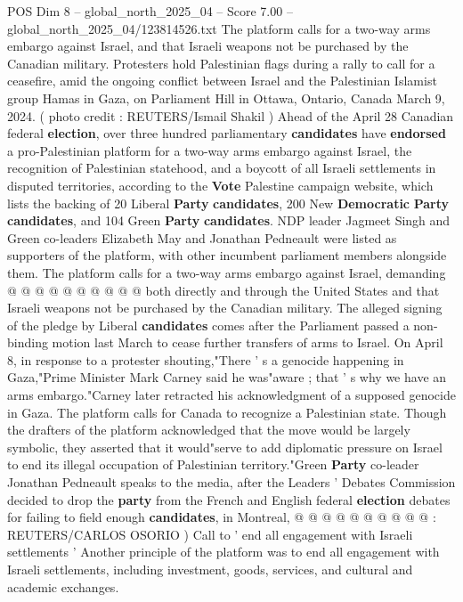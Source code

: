 \begin{textsample}{POS Dim 8 – global\_north\_2025\_04 – Score 7.00 – global\_north\_2025\_04/123814526.txt}  \label{ex:f8_pos_374}
The platform calls for a two-way arms embargo against Israel, and that Israeli weapons not be purchased by the Canadian military.
Protesters hold Palestinian flags during a rally to call for a ceasefire, amid the ongoing conflict between Israel and the Palestinian Islamist group Hamas in Gaza, on Parliament Hill in Ottawa, Ontario, Canada March 9, 2024. ( photo credit : REUTERS/Ismail Shakil ) Ahead of the April 28 Canadian federal \textbf{election}, over three hundred parliamentary \textbf{candidates} have \textbf{endorsed} a pro-Palestinian platform for a two-way arms embargo against Israel, the recognition of Palestinian statehood, and a boycott of all Israeli settlements in disputed territories, according to the \textbf{Vote} Palestine campaign website, which lists the backing of 20 Liberal \textbf{Party} \textbf{candidates}, 200 New \textbf{Democratic} \textbf{Party} \textbf{candidates}, and 104 Green \textbf{Party} \textbf{candidates}.
NDP leader Jagmeet Singh and Green co-leaders Elizabeth May and Jonathan Pedneault were listed as supporters of the platform, with other incumbent parliament members alongside them.
The platform calls for a two-way arms embargo against Israel, demanding @ @ @ @ @ @ @ @ @ @ both directly and through the United States and that Israeli weapons not be purchased by the Canadian military.
The alleged signing of the pledge by Liberal \textbf{candidates} comes after the Parliament passed a non-binding motion last March to cease further transfers of arms to Israel.
On April 8, in response to a protester shouting,"There ' s a genocide happening in Gaza,"Prime Minister Mark Carney said he was"aware ; that ' s why we have an arms embargo."Carney later retracted his acknowledgment of a supposed genocide in Gaza.
The platform calls for Canada to recognize a Palestinian state.
Though the drafters of the platform acknowledged that the move would be largely symbolic, they asserted that it would"serve to add diplomatic pressure on Israel to end its illegal occupation of Palestinian territory."Green \textbf{Party} co-leader Jonathan Pedneault speaks to the media, after the Leaders ' Debates Commission decided to drop the \textbf{party} from the French and English federal \textbf{election} debates for failing to field enough \textbf{candidates}, in Montreal, @ @ @ @ @ @ @ @ @ @ : REUTERS/CARLOS OSORIO ) Call to ' end all engagement with Israeli settlements ' Another principle of the platform was to end all engagement with Israeli settlements, including investment, goods, services, and cultural and academic exchanges.

\end{textsample}

